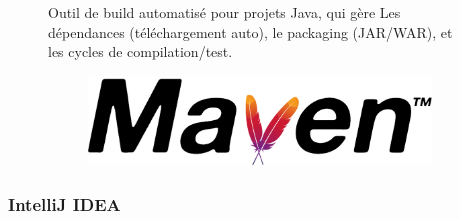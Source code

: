 \documentclass[12pt,a4paper]{report}
\begin{document}
	\begin{figure}[H]
		\begin{minipage}{0.8\textwidth}
			Outil de build automatisé pour projets Java, qui gère Les dépendances (téléchargement auto), le packaging (JAR/WAR), et les cycles de compilation/test.
		\end{minipage}
		\hfill
		\begin{minipage}{0.15\textwidth} 
			\begin{figure}[H]
				\centering
				\includegraphics[width=\linewidth]{maven-logo.png}
				\label{fig:maven-logo}
			\end{figure}
		\end{minipage}
	\end{figure}
	
	\subsubsection{IntelliJ IDEA}
	
\end{document}
